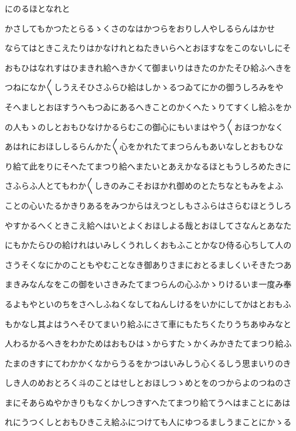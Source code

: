 \documentclass[a4paper,11pt,landscape]{ltjtarticle}
\begin{document}
にのるほとなれと
\par\medskip
かさしてもかつたとらるゝくさのなはかつらをおりし人やしるらんはかせ
\par\medskip
ならてはときこえたりはかなけれとねたきいらへとおほすなをこのないしにそ
\par\medskip
おもひはなれすはひまきれ給へきかくて御まいりはきたのかたそひ給ふへきを
\par\medskip
つねになか〱しうえそひさふらひ給はしかゝるつゐてにかの御うしろみをや
\par\medskip
そへましとおほすうへもつゐにあるへきことのかくへたゝりてすくし給ふをか
\par\medskip
の人もゝのしとおもひなけかるらむこの御心にもいまはやう〱おほつかなく
\par\medskip
あはれにおほししるらんかた〱心をかれたてまつらんもあいなしとおもひな
\par\medskip
り給て此をりにそへたてまつり給へまたいとあえかなるほともうしろめたきに
\par\medskip
さふらふ人とてもわか〱しきのみこそおほかれ御めのとたちなともみをよふ
\par\medskip
ことの心いたるかきりあるをみつからはえつとしもさふらはさらむほとうしろ
\par\medskip
やすかるへくときこえ給へはいとよくおほしよる哉とおほしてさなんとあなた
\par\medskip
にもかたらひの給けれはいみしくうれしくおもふことかなひ侍る心ちして人の
\par\medskip
さうそくなにかのこともやむことなき御ありさまにおとるましくいそきたつあ
\par\medskip
まきみなんなをこの御をいさきみたてまつらんの心ふかゝりけるいま一度み奉
\par\medskip
るよもやといのちをさへしふねくなしてねんしけるをいかにしてかはとおもふ
\par\medskip
もかなし其よはうへそひてまいり給ふにさて車にもたちくたりうちあゆみなと
\par\medskip
人わるかるへきをわかためはおもひはゝからすたゝかくみかきたてまつり給ふ
\par\medskip
たまのきすにてわかかくなからうるをかつはいみしう心くるしう思まいりのき
\par\medskip
しき人のめおとろく斗のことはせしとおほしつゝめとをのつからよのつねのさ
\par\medskip
まにそあらぬやかきりもなくかしつきすへたてまつり給てうへはまことにあは
\par\medskip
れにうつくしとおもひきこえ給ふにつけても人にゆつるましうまことにかゝる
\end{document}
